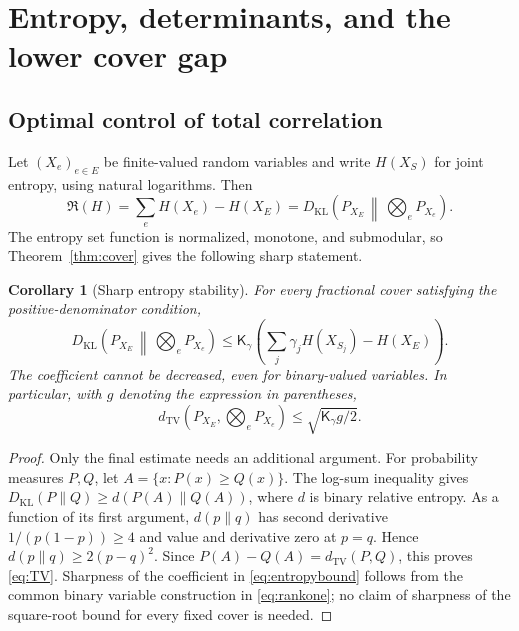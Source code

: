 \documentclass[11pt]{article}
\newtheorem{corollary}[theorem]{Corollary}
\theoremstyle{definition}
\theoremstyle{remark}
\newcommand{\1}{\mathbf 1}
\newcommand{\KL}{D_{\mathrm{KL}}}
\newcommand{\TV}{d_{\mathrm{TV}}}
\newcommand{\Red}{\mathfrak R}
\newcommand{\Kopt}{\mathsf K}
\begin{document}
\section{Entropy, determinants, and the lower cover gap}
\label{sec:entropy}

\subsection{Optimal control of total correlation}

Let $(X_e)_{e\in E}$ be finite-valued random variables and write $H(X_S)$ for
joint entropy, using natural logarithms. Then
\begin{equation}
 \Red(H)=\sum_e H(X_e)-H(X_E)
 =\KL\!\left(P_{X_E}\,\middle\|\,\bigotimes_e P_{X_e}\right).
 \label{eq:TC}
\end{equation}
The entropy set function is normalized, monotone, and submodular, so
Theorem~\ref{thm:cover} gives the following sharp statement.

\begin{corollary}[Sharp entropy stability]
\label{cor:entropy}
For every fractional cover satisfying the positive-denominator condition,
\begin{equation}
 \KL\!\left(P_{X_E}\,\middle\|\,\bigotimes_e P_{X_e}\right)
 \le\Kopt_\gamma\left(\sum_j\gamma_j H(X_{S_j})-H(X_E)\right).
 \label{eq:entropybound}
\end{equation}
The coefficient cannot be decreased, even for binary-valued variables.
In particular, with $g$ denoting the expression in parentheses,
\begin{equation}
 \TV\!\left(P_{X_E},\bigotimes_eP_{X_e}\right)
 \le\sqrt{\Kopt_\gamma g/2}.
 \label{eq:TV}
\end{equation}
\end{corollary}

\begin{proof}
Only the final estimate needs an additional argument. For probability measures
$P,Q$, let $A=\{x:P(x)\ge Q(x)\}$. The log-sum inequality gives
$\KL(P\|Q)\ge d(P(A)\|Q(A))$, where $d$ is binary relative entropy.
As a function of its first argument, $d(p\|q)$ has second derivative
$1/(p(1-p))\ge4$ and value and derivative zero at $p=q$.
Hence $d(p\|q)\ge2(p-q)^2$. Since $P(A)-Q(A)=\TV(P,Q)$, this proves
\eqref{eq:TV}. Sharpness of the coefficient in \eqref{eq:entropybound} follows
from the common binary variable construction in \eqref{eq:rankone}; no claim
of sharpness of the square-root bound for every fixed cover is needed.
\end{proof}
\end{document}
